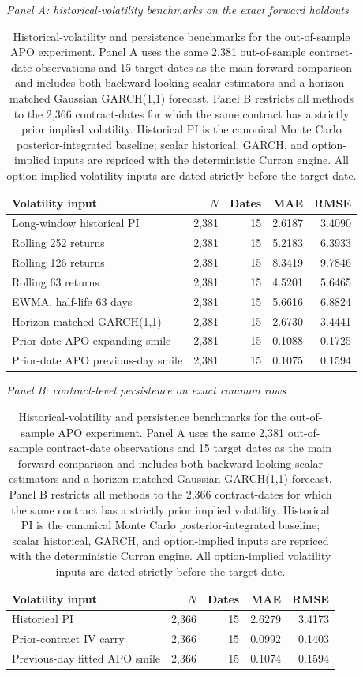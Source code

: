 \begin{table}[t]
\centering
\caption{Historical-volatility and persistence benchmarks for the out-of-sample APO experiment. Panel A uses the same 2,381 out-of-sample contract-date observations and 15 target dates as the main forward comparison and includes both backward-looking scalar estimators and a horizon-matched Gaussian GARCH(1,1) forecast. Panel B restricts all methods to the 2,366 contract-dates for which the same contract has a strictly prior implied volatility. Historical PI is the canonical Monte Carlo posterior-integrated baseline; scalar historical, GARCH, and option-implied inputs are repriced with the deterministic Curran engine. All option-implied volatility inputs are dated strictly before the target date.}\label{tab:recent_history_persistence}

\textit{Panel A: historical-volatility benchmarks on the exact forward holdouts}\\[2pt]
\begin{tabular}{lrrrr}
\toprule
Volatility input & $N$ & Dates & MAE & RMSE\\
\midrule
Long-window historical PI & 2,381 & 15 & 2.6187 & 3.4090\\
Rolling 252 returns & 2,381 & 15 & 5.2183 & 6.3933\\
Rolling 126 returns & 2,381 & 15 & 8.3419 & 9.7846\\
Rolling 63 returns & 2,381 & 15 & 4.5201 & 5.6465\\
EWMA, half-life 63 days & 2,381 & 15 & 5.6616 & 6.8824\\
Horizon-matched GARCH(1,1) & 2,381 & 15 & 2.6730 & 3.4441\\
Prior-date APO expanding smile & 2,381 & 15 & 0.1088 & 0.1725\\
Prior-date APO previous-day smile & 2,381 & 15 & 0.1075 & 0.1594\\
\bottomrule
\end{tabular}

\vspace{5pt}
\textit{Panel B: contract-level persistence on exact common rows}\\[2pt]
\begin{tabular}{lrrrr}
\toprule
Volatility input & $N$ & Dates & MAE & RMSE\\
\midrule
Historical PI & 2,366 & 15 & 2.6279 & 3.4173\\
Prior-contract IV carry & 2,366 & 15 & 0.0992 & 0.1403\\
Previous-day fitted APO smile & 2,366 & 15 & 0.1074 & 0.1594\\
\bottomrule
\end{tabular}
\end{table}

